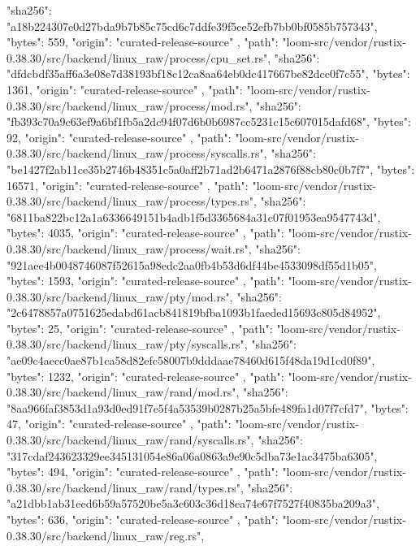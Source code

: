 {{      "sha256": "a18b224307e0d27bda9b7b85c75cd6c7ddfe39f5ce52efb7bb0bf0585b757343",
      "bytes": 559,
      "origin": "curated-release-source"
    },
    {
      "path": "loom-src/vendor/rustix-0.38.30/src/backend/linux_raw/process/cpu_set.rs",
      "sha256": "dfdcbdf35aff6a3e08e7d38193bf18c12ca8aa64eb0dc417667be82dcc0f7c55",
      "bytes": 1361,
      "origin": "curated-release-source"
    },
    {
      "path": "loom-src/vendor/rustix-0.38.30/src/backend/linux_raw/process/mod.rs",
      "sha256": "fb393c70a9c63ef9a6bf1fb5a2dc94f07d6b0b6987cc5231c15c607015dafd68",
      "bytes": 92,
      "origin": "curated-release-source"
    },
    {
      "path": "loom-src/vendor/rustix-0.38.30/src/backend/linux_raw/process/syscalls.rs",
      "sha256": "be1427f2ab11ce35b2746b48351c5a0aff2b71ad2b6471a2876f88cb80c0b7f7",
      "bytes": 16571,
      "origin": "curated-release-source"
    },
    {
      "path": "loom-src/vendor/rustix-0.38.30/src/backend/linux_raw/process/types.rs",
      "sha256": "6811ba822bc12a1a6336649151b4adb1f5d3365684a31c07f01953ea9547743d",
      "bytes": 4035,
      "origin": "curated-release-source"
    },
    {
      "path": "loom-src/vendor/rustix-0.38.30/src/backend/linux_raw/process/wait.rs",
      "sha256": "921aee4b0048746087f52615a98edc2aa0fb4b53d6df44be4533098df55d1b05",
      "bytes": 1593,
      "origin": "curated-release-source"
    },
    {
      "path": "loom-src/vendor/rustix-0.38.30/src/backend/linux_raw/pty/mod.rs",
      "sha256": "2c6478857a0751625edabd61acb841819bfba1093b1faeded15693c805d84952",
      "bytes": 25,
      "origin": "curated-release-source"
    },
    {
      "path": "loom-src/vendor/rustix-0.38.30/src/backend/linux_raw/pty/syscalls.rs",
      "sha256": "ae09c4aecc0ae87b1ca58d82efc58007b9dddaae78460d615f48da19d1cd0f89",
      "bytes": 1232,
      "origin": "curated-release-source"
    },
    {
      "path": "loom-src/vendor/rustix-0.38.30/src/backend/linux_raw/rand/mod.rs",
      "sha256": "8aa966faf3853d1a93d0ed91f7e5f4a53539b0287b25a5bfe489fa1d07f7cfd7",
      "bytes": 47,
      "origin": "curated-release-source"
    },
    {
      "path": "loom-src/vendor/rustix-0.38.30/src/backend/linux_raw/rand/syscalls.rs",
      "sha256": "317cdaf243623329ee345131054e86a06a0863a9e90c5dba73e1ac3475ba6305",
      "bytes": 494,
      "origin": "curated-release-source"
    },
    {
      "path": "loom-src/vendor/rustix-0.38.30/src/backend/linux_raw/rand/types.rs",
      "sha256": "a21dbb1ab31eed6b59a57520be5a3c603c36d18ea74e67f7527f40835ba209a3",
      "bytes": 636,
      "origin": "curated-release-source"
    },
    {
      "path": "loom-src/vendor/rustix-0.38.30/src/backend/linux_raw/reg.rs",
}}
